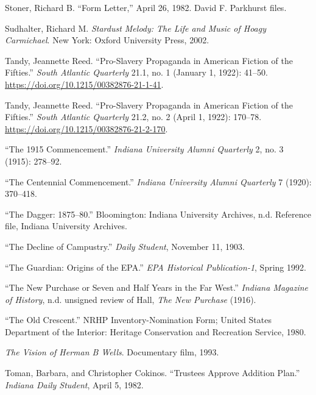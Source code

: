 \documentclass[
  american,
  letterpaper,
]{scrreprt}
\newlength{\cslhangindent}
\newenvironment{CSLReferences}[2] %
 {\begin{list}{}{%
  \setlength{\itemindent}{0pt}
  \setlength{\leftmargin}{0pt}
  \setlength{\parsep}{0pt}
  \ifodd #1
   \setlength{\leftmargin}{\cslhangindent}
   \setlength{\itemindent}{-1\cslhangindent}
  \fi
  \setlength{\itemsep}{#2\baselineskip}}}
 {\end{list}}
\begin{document}
\begin{CSLReferences}{1}{0}
Stoner, Richard B. {``Form Letter,''} April 26, 1982. David F. Parkhurst
files.

Sudhalter, Richard M. \emph{Stardust Melody: The Life and Music of Hoagy
Carmichael}. New York: Oxford University Press, 2002.

Tandy, Jeannette Reed. {``Pro-Slavery Propaganda in American Fiction of
the Fifties.''} \emph{South Atlantic Quarterly} 21.1, no. 1 (January 1,
1922): 41--50. \url{https://doi.org/10.1215/00382876-21-1-41}.

Tandy, Jeannette Reed. {``Pro-Slavery Propaganda in American Fiction of
the Fifties.''} \emph{South Atlantic Quarterly} 21.2, no. 2 (April 1,
1922): 170--78. \url{https://doi.org/10.1215/00382876-21-2-170}.

{``The 1915 Commencement.''} \emph{Indiana University Alumni Quarterly}
2, no. 3 (1915): 278--92.

{``The Centennial Commencement.''} \emph{Indiana University Alumni
Quarterly} 7 (1920): 370--418.

{``The Dagger: 1875--80.''} Bloomington: Indiana University Archives,
n.d. Reference file, Indiana University Archives.

{``The Decline of Campustry.''} \emph{Daily Student}, November 11, 1903.

{``The Guardian: Origins of the EPA.''} \emph{EPA Historical
Publication-1}, Spring 1992.

{``The New Purchase or Seven and Half Years in the Far West.''}
\emph{Indiana Magazine of History}, n.d. unsigned review of Hall,
\emph{The New Purchase} (1916).

{``The Old Crescent.''} NRHP Inventory-Nomination Form; United States
Department of the Interior: Heritage Conservation and Recreation
Service, 1980.

\emph{The Vision of Herman {B} Wells}. Documentary film, 1993.

Toman, Barbara, and Christopher Cokinos. {``Trustees Approve Addition
Plan.''} \emph{Indiana Daily Student}, April 5, 1982.


\end{CSLReferences}
\end{document}
